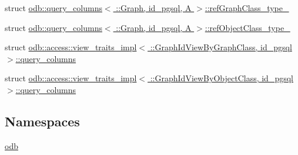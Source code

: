 \begin{DoxyCompactItemize}
struct \hyperlink{structodb_1_1query__columns_3_01_1_1_graph_00_01id__pgsql_00_01_a_01_4_1_1ref_graph_class__type__}{odb\+::query\+\_\+columns$<$ \+::\+Graph, id\+\_\+pgsql, A $>$\+::ref\+Graph\+Class\+\_\+type\+\_\+}
\item 
struct \hyperlink{structodb_1_1query__columns_3_01_1_1_graph_00_01id__pgsql_00_01_a_01_4_1_1ref_object_class__type__}{odb\+::query\+\_\+columns$<$ \+::\+Graph, id\+\_\+pgsql, A $>$\+::ref\+Object\+Class\+\_\+type\+\_\+}
\item 
struct \hyperlink{structodb_1_1access_1_1view__traits__impl_3_01_1_1_graph_id_view_by_graph_class_00_01id__pgsql_01_4_1_1query__columns}{odb\+::access\+::view\+\_\+traits\+\_\+impl$<$ \+::\+Graph\+Id\+View\+By\+Graph\+Class, id\+\_\+pgsql $>$\+::query\+\_\+columns}
\item 
struct \hyperlink{structodb_1_1access_1_1view__traits__impl_3_01_1_1_graph_id_view_by_object_class_00_01id__pgsql_01_4_1_1query__columns}{odb\+::access\+::view\+\_\+traits\+\_\+impl$<$ \+::\+Graph\+Id\+View\+By\+Object\+Class, id\+\_\+pgsql $>$\+::query\+\_\+columns}
\end{DoxyCompactItemize}
\subsection*{Namespaces}
\begin{DoxyCompactItemize}
\item 
 \hyperlink{namespaceodb}{odb}
\end{DoxyCompactItemize}
